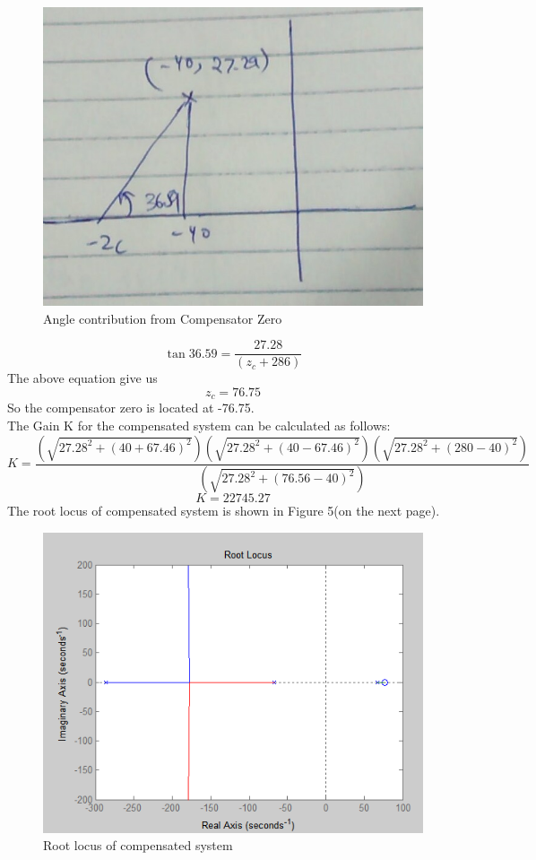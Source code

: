 \documentclass{article}
\begin{document}
\begin{figure}[h]
  \includegraphics[width=\linewidth]{zero_c.jpg}
  \caption{Angle contribution from Compensator Zero}
  \label{fig:boat1}
\end{figure}

\[\tan{36.59} = \frac{27.28}{(z_c+286)} \]
The above equation give us 
\[ z_c = 76.75 \]
So the compensator zero is located at -76.75.
\\
The Gain K for the compensated system can be calculated as follows:
\[ K = \frac{(\sqrt{27.28^2 + (40+67.46)^2})(\sqrt{27.28^2 + (40-67.46)^2})(\sqrt{27.28^2 + (280-40)^2})}{(\sqrt{27.28^2 + (76.56-40)^2})} \]
\[ K= 22745.27\]
The root locus of compensated system is shown in Figure 5(on the next page).
\begin{figure}[h]
  \includegraphics[width=\linewidth]{fig2.PNG}
  \caption{Root locus of compensated system}
  \label{fig:boat1}
\end{figure}
\end{document}

